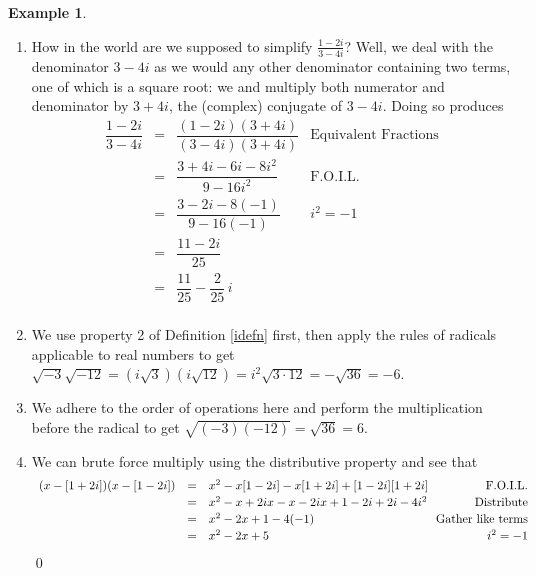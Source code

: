 \documentclass[11pt]{article}
\theoremstyle{definition}  %
\newtheorem{ex}{\bf Example}
\begin{document}
\begin{ex}
\begin{enumerate}
\item  How in the world are we supposed to simplify $\frac{1-2i}{3-4i}$?  Well, we deal with the denominator $3-4i$ as we would any other denominator containing two terms, one of which is a square root: we and multiply both numerator and denominator by $3+4i$, the (complex) conjugate of $3 - 4i$.  Doing so produces\[\begin{array}{rclr}

 \dfrac{1-2i}{3-4i} & = & \dfrac{(1-2i)(3+4i)}{(3-4i)(3+4i)} & \text{Equivalent Fractions} \\[8pt]

                     & = &   \dfrac{3 + 4i - 6i - 8i^2}{9 - 16i^2} & \text{F.O.I.L.}\\[8pt]
										 & = & \dfrac{3 - 2i - 8(-1)}{9  - 16(-1)} & \text{$i^2 = -1$}\\[8pt]
						         & = &  \dfrac{11 - 2i}{25} & \\[8pt]
										  & = & \dfrac{11}{25} - \dfrac{2}{25} \, i & \\ \end{array}\]
										

\item  We use property 2 of Definition \ref{idefn} first, then apply the rules of radicals applicable to real numbers to get $\sqrt{-3} \sqrt{-12} = \left(i \sqrt{3}\right) \left(i \sqrt{12}\right) = i^2 \sqrt{3\cdot 12} = -\sqrt{36} = -6$.

\item  We adhere to the order of operations here and perform the multiplication before the radical to get  $\sqrt{(-3)(-12)} = \sqrt{36} = 6$. 

\item  We can brute force multiply using the distributive property and see that \[\begin{array}{rclr} (x-[1+2i])(x-[1-2i]) & = &  x^2 -x[1-2i]-x[1+2i]+[1-2i][1+2i] & \text{F.O.I.L.}\\[2pt]

																					 &	= & x^2-x+2ix-x-2ix+1-2i+2i-4i^2 & \text{Distribute} \\ [2pt]
																					 &	= & x^2-2x + 1-4(-1)& \hspace*{-.05in}\text{Gather like terms}\\[2pt]
																					 & =  & x^2 -2x +5 & i^2=-1 \\ \end{array}\]  \qed

\end{enumerate}

\end{ex}
\end{document}
